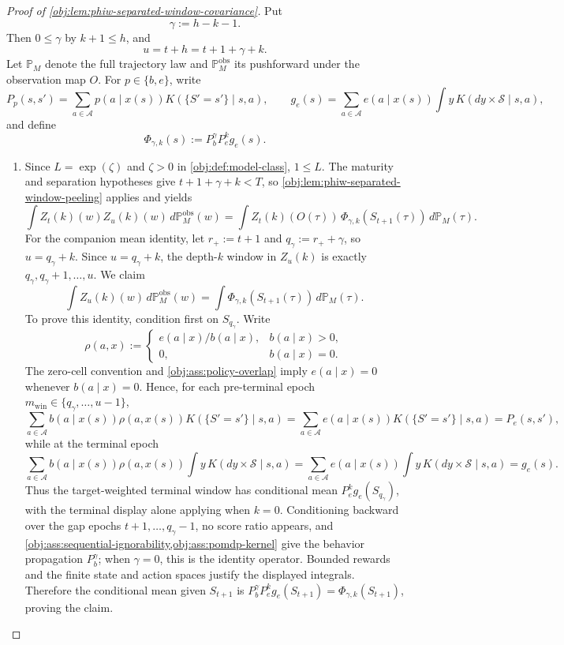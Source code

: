 \documentclass[11pt]{article}
\begin{document}
\begin{proof}[Proof of \cref{obj:lem:phiw-separated-window-covariance}]
Put
\[
\gamma:=h-k-1 .
\]
Then \(0\le \gamma\) by \(k+1\le h\), and
\[
u=t+h=t+1+\gamma+k .
\]
Let \(\mathbb P_M\) denote the full trajectory law and \(\mathbb P_M^{\mathrm{obs}}\) its pushforward under the observation map \(O\). For \(p\in\{b,e\}\), write
\[
P_p(s,s')=\sum_{a\in\mathcal A}p(a\mid x(s))K(\{S'=s'\}\mid s,a),
\qquad
g_e(s)=\sum_{a\in\mathcal A}e(a\mid x(s))\int y\,K(dy\times\mathcal S\mid s,a),
\]
and define
\[
\Phi_{\gamma,k}(s):=P_b^\gamma P_e^k g_e(s).
\]

\begin{enumerate}
\item Since \(L=\exp(\zeta)\) and \(\zeta>0\) in \cref{obj:def:model-class}, \(1\le L\). The maturity and separation hypotheses give \(t+1+\gamma+k<T\), so \cref{obj:lem:phiw-separated-window-peeling} applies and yields
\[
\int Z_t(k)(w)Z_u(k)(w)\,d\mathbb P_M^{\mathrm{obs}}(w)
=
\int Z_t(k)(O(\tau))\,\Phi_{\gamma,k}(S_{t+1}(\tau))\,d\mathbb P_M(\tau).
\]
For the companion mean identity, let \(r_{+}:=t+1\) and \(q_{\gamma}:=r_{+}+\gamma\), so \(u=q_{\gamma}+k\). Since \(u=q_{\gamma}+k\), the depth-\(k\) window in \(Z_u(k)\) is exactly \(q_{\gamma},q_{\gamma}+1,\ldots,u\). We claim
\[
\int Z_u(k)(w)\,d\mathbb P_M^{\mathrm{obs}}(w)
=
\int \Phi_{\gamma,k}(S_{t+1}(\tau))\,d\mathbb P_M(\tau).
\]
To prove this identity, condition first on \(S_{q_{\gamma}}\). Write
\[
\rho(a,x):=
\begin{cases}
 e(a\mid x)/b(a\mid x),& b(a\mid x)>0,\\
 0,& b(a\mid x)=0.
\end{cases}
\]
The zero-cell convention and \cref{obj:ass:policy-overlap} imply \(e(a\mid x)=0\) whenever \(b(a\mid x)=0\). Hence, for each pre-terminal epoch \(m_{\mathrm{win}}\in\{q_{\gamma},\ldots,u-1\}\),
\[
\sum_{a\in\mathcal A} b(a\mid x(s))\rho(a,x(s))
        K(\{S'=s'\}\mid s,a)
=
\sum_{a\in\mathcal A} e(a\mid x(s))K(\{S'=s'\}\mid s,a)
=P_e(s,s'),
\]
while at the terminal epoch
\[
\sum_{a\in\mathcal A} b(a\mid x(s))\rho(a,x(s))
        \int y\,K(dy\times\mathcal S\mid s,a)
=
\sum_{a\in\mathcal A} e(a\mid x(s))
        \int y\,K(dy\times\mathcal S\mid s,a)
=g_e(s).
\]
Thus the target-weighted terminal window has conditional mean \(P_e^k g_e(S_{q_{\gamma}})\), with the terminal display alone applying when \(k=0\). Conditioning backward over the gap epochs \(t+1,\ldots,q_{\gamma}-1\), no score ratio appears, and \cref{obj:ass:sequential-ignorability,obj:ass:pomdp-kernel} give the behavior propagation \(P_b^\gamma\); when \(\gamma=0\), this is the identity operator. Bounded rewards and the finite state and action spaces justify the displayed integrals. Therefore the conditional mean given \(S_{t+1}\) is \(P_b^\gamma P_e^k g_e(S_{t+1})=\Phi_{\gamma,k}(S_{t+1})\), proving the claim. %

\end{enumerate}
\end{proof}
\end{document}
